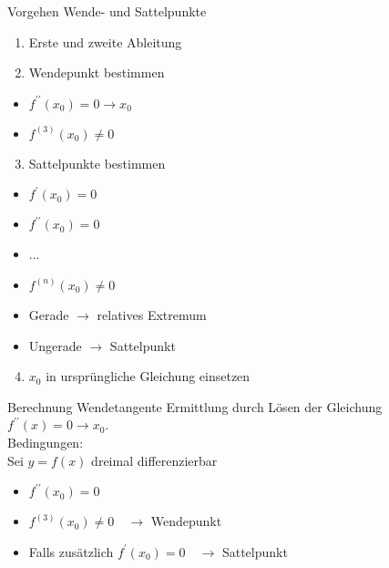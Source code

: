 \begin{KR}{Vorgehen Wende- und Sattelpunkte}
    \begin{enumerate}
  \item Erste und zweite Ableitung

  \item Wendepunkt bestimmen

\end{enumerate}

\begin{itemize}
  \item $f^{\prime \prime}\left(x_{0}\right)=0 \rightarrow x_{0}$
  \item $f^{(3)}\left(x_{0}\right) \neq 0$
\end{itemize}

\begin{enumerate}
  \setcounter{enumi}{2}
  \item Sattelpunkte bestimmen
\end{enumerate}

\begin{itemize}
  \item $f^{\prime}\left(x_{0}\right)=0$
  \item $f^{\prime \prime}\left(x_{0}\right)=0$
  \item ...
  \item $f^{(n)}\left(x_{0}\right) \neq 0$
  \item Gerade $\rightarrow$ relatives Extremum
  \item Ungerade $\rightarrow$ Sattelpunkt
\end{itemize}

\begin{enumerate}
  \setcounter{enumi}{3}
  \item $x_{0}$ in ursprüngliche Gleichung einsetzen
\end{enumerate}
\end{KR}

\begin{KR}{Berechnung Wendetangente}
    Ermittlung durch Lösen der Gleichung $f^{\prime \prime}(x)=0 \rightarrow x_{0}$.\\
    Bedingungen:\\
    Sei $y=f(x)$ dreimal differenzierbar

\begin{itemize}
  \item $f^{\prime \prime}\left(x_{0}\right)=0$
  \item $f^{(3)}\left(x_{0}\right) \neq 0 \quad \rightarrow$ Wendepunkt
  \item Falls zusätzlich $f^{\prime}\left(x_{0}\right)=0 \quad \rightarrow$ Sattelpunkt
\end{itemize}
    
\end{KR}

